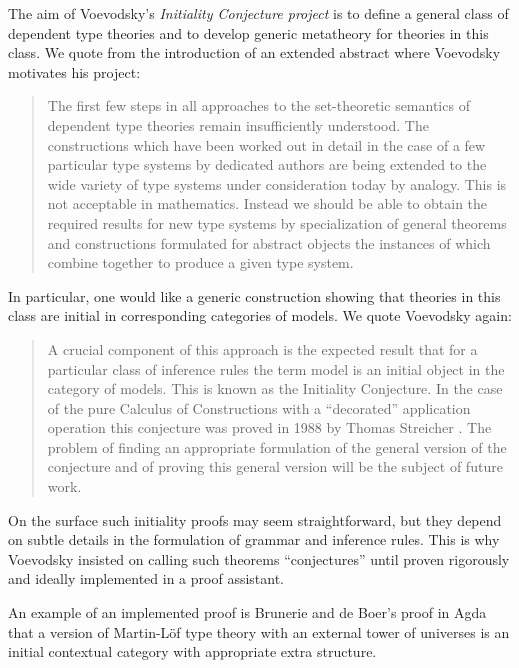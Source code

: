 \documentclass[11pt,a4paper]{article}
\theoremstyle{definition}
\begin{document}
The aim of Voevodsky's  {\em Initiality Conjecture project} is to define a general class of dependent type theories and to develop generic metatheory for theories in this class. We quote from the introduction of an extended abstract where Voevodsky \cite{voevodsky:initiality} motivates his project:
\begin{quotation}
The first few steps in all approaches to the set-theoretic semantics of dependent
type theories remain insuﬃciently understood. The constructions which have been
worked out in detail in the case of a few particular type systems by dedicated authors
are being extended to the wide variety of type systems under consideration today by
analogy. This is not acceptable in mathematics. Instead we should be able to obtain
the required results for new type systems by specialization of general theorems and
constructions formulated for abstract objects the instances of which combine together
to produce a given type system.
\end{quotation}
In particular, one would like a generic construction showing that theories in this class are initial in corresponding categories of models. We quote Voevodsky \cite{voevodsky:initiality} again:
\begin{quotation}
A crucial component of this approach is the expected result that for a particular
class of inference rules the term model is an initial object in the category of models.
This is known as the Initiality Conjecture. In the case of the pure Calculus of
Constructions with a “decorated” application operation this conjecture was proved in
1988 by Thomas Streicher \cite{streicher:thesis}. The problem of finding an appropriate formulation
of the general version of the conjecture and of proving this general version will be the
subject of future work.
\end{quotation}
On the surface such initiality proofs may seem straightforward, but they depend on subtle details in the formulation of grammar and inference rules. This is why Voevodsky insisted on calling such theorems ``conjectures'' until proven rigorously and ideally implemented in a proof assistant.

An example of an implemented proof is Brunerie and de Boer's \cite{Brunerie:initiality,deBoer:lic} proof in Agda that a version of Martin-Löf type theory with an external tower of universes is an initial contextual category \cite{cartmell:phd,cartmell:apal} with appropriate extra structure. %
\end{document}
